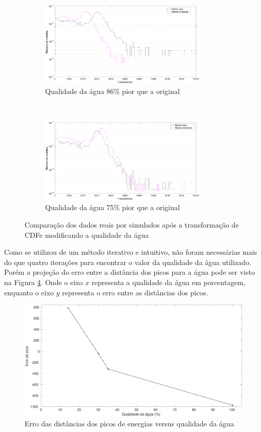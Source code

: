 \begin{figure}[ht]
	\centering
	\begin{subfigure}{0.5\textwidth}
		\centering
		\includegraphics[width=8cm]{textuais/simulacao/figuras/hist_evt3.pdf}
		\caption{Qualidade da água 86\% pior que a original}
		\label{fig:a3}
	\end{subfigure}%
	~ 
	\begin{subfigure}{0.5\textwidth}
		\centering		
		\includegraphics[width=8cm]{textuais/simulacao/figuras/hist_evt5.pdf}
		\caption{Qualidade da água 75\% pior que a original}
		\label{fig:a4}
	\end{subfigure}
	\caption{Comparação dos dados reais por simulados após a transformação de CDFe modificando a qualidade da água}
\end{figure}

Como se utilizou de um método iterativo e intuitivo, não foram necessárias mais do que quatro iterações para encontrar o valor da qualidade da água utilizado. Porém a projeção do erro entre a distância dos picos para a água pode ser visto na Figura \ref{fig:erro_qualidade}. Onde o eixo $x$ representa a qualidade da água em porcentagem, enquanto o eixo $y$ representa o erro entre as distâncias dos picos.

\begin{figure}[H]
	\centering
	\includegraphics[width=16cm]{textuais/dadosreais/figuras/erro_qualidade.pdf}
	\caption{Erro das distâncias dos picos de energias versus qualidade da água }
	\label{fig:erro_qualidade}
\end{figure}
